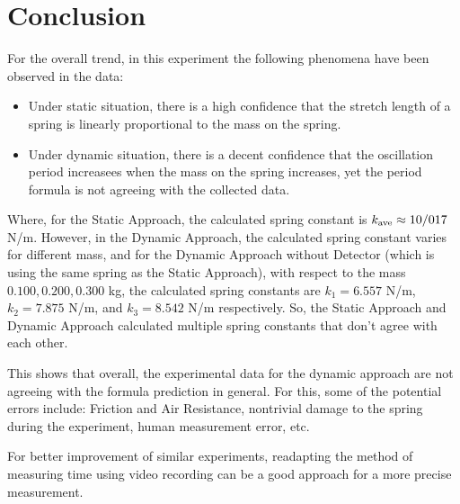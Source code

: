 \documentclass{article}
\begin{document}
\section{Conclusion}
For the overall trend, in this experiment the following phenomena have been observed in the data:
\begin{itemize}
    \item Under static situation, there is a high confidence that the stretch length of a spring is linearly proportional to the mass on the spring.
    \item Under dynamic situation, there is a decent confidence that the oscillation period increasees when the mass on the spring increases, yet the period formula is not agreeing with the collected data.
\end{itemize}
Where, for the Static Approach, the calculated spring constant is $k_\textmd{ave} \approx 10/017$ N/m. However, in the Dynamic Approach, the calculated spring constant varies for different mass, and for the Dynamic Approach without Detector (which is using the same spring as the Static Approach), with respect to the mass $0.100,0.200,0.300$ kg, the calculated spring constants are $k_1 = 6.557$ N/m, $k_2=7.875$ N/m, and $k_3=8.542$ N/m respectively. So, the Static Approach and Dynamic Approach calculated multiple spring constants that don't agree with each other.

This shows that overall, the experimental data for the dynamic approach are not agreeing with the formula prediction in general. For this, some of the potential errors include: Friction and Air Resistance, nontrivial damage to the spring during the experiment, human measurement error, etc.

For better improvement of similar experiments, readapting the method of measuring time using video recording can be a good approach for a more precise measurement.
\end{document}
